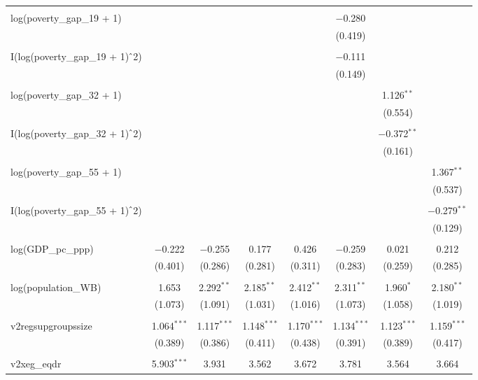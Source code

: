 \documentclass[a4paper, 12pt]{article}
\begin{document}
\begin{table}[!htbp]
{\begin{tabular}{@{\extracolsep{5pt}}lccccccc}
  & & & & & & & \\ 
 log(poverty\_gap\_19 + 1) &  &  &  &  & $-$0.280 &  &  \\ 
  &  &  &  &  & (0.419) &  &  \\ 
  & & & & & & & \\ 
 I(log(poverty\_gap\_19 + 1)$\hat{\mkern6mu}$2) &  &  &  &  & $-$0.111 &  &  \\ 
  &  &  &  &  & (0.149) &  &  \\ 
  & & & & & & & \\ 
 log(poverty\_gap\_32 + 1) &  &  &  &  &  & 1.126$^{**}$ &  \\ 
  &  &  &  &  &  & (0.554) &  \\ 
  & & & & & & & \\ 
 I(log(poverty\_gap\_32 + 1)$\hat{\mkern6mu}$2) &  &  &  &  &  & $-$0.372$^{**}$ &  \\ 
  &  &  &  &  &  & (0.161) &  \\ 
  & & & & & & & \\ 
 log(poverty\_gap\_55 + 1) &  &  &  &  &  &  & 1.367$^{**}$ \\ 
  &  &  &  &  &  &  & (0.537) \\ 
  & & & & & & & \\ 
 I(log(poverty\_gap\_55 + 1)$\hat{\mkern6mu}$2) &  &  &  &  &  &  & $-$0.279$^{**}$ \\ 
  &  &  &  &  &  &  & (0.129) \\ 
  & & & & & & & \\ 
 log(GDP\_pc\_ppp) & $-$0.222 & $-$0.255 & 0.177 & 0.426 & $-$0.259 & 0.021 & 0.212 \\ 
  & (0.401) & (0.286) & (0.281) & (0.311) & (0.283) & (0.259) & (0.285) \\ 
  & & & & & & & \\ 
 log(population\_WB) & 1.653 & 2.292$^{**}$ & 2.185$^{**}$ & 2.412$^{**}$ & 2.311$^{**}$ & 1.960$^{*}$ & 2.180$^{**}$ \\ 
  & (1.073) & (1.091) & (1.031) & (1.016) & (1.073) & (1.058) & (1.019) \\ 
  & & & & & & & \\ 
 v2regsupgroupssize & 1.064$^{***}$ & 1.117$^{***}$ & 1.148$^{***}$ & 1.170$^{***}$ & 1.134$^{***}$ & 1.123$^{***}$ & 1.159$^{***}$ \\ 
  & (0.389) & (0.386) & (0.411) & (0.438) & (0.391) & (0.389) & (0.417) \\ 
  & & & & & & & \\ 
 v2xeg\_eqdr & 5.903$^{***}$ & 3.931 & 3.562 & 3.672 & 3.781 & 3.564 & 3.664 \\ 

\end{tabular}}
\end{table}
\end{document}
